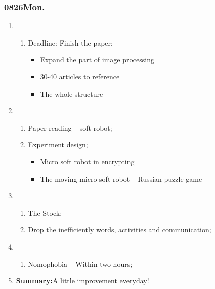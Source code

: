\subsubsection{0826Mon.}
\begin{enumerate}
	\item \ncquaone
	\begin{enumerate}[(1)]
		\item Deadline: Finish the paper;\rightundoneBlack
		\begin{itemize}
			\item Expand the part of image processing
			\item 30-40 articles to reference
			\item The whole structure 
		\end{itemize}
	\end{enumerate}
	
	\item \ncquatwo	
	\begin{enumerate}[(1)]
		\item Paper reading -- soft robot;\rightundoneBlack
		\item Experiment design;\rightundoneBlack
		\begin{itemize}
			\item Micro soft robot in encrypting
			\item The moving micro soft robot -- Russian puzzle game 
		\end{itemize}
		
	\end{enumerate}
	
	\item \ncquathree
	\begin{enumerate}[(1)]
		\item The Stock;\rightundoneBlack
		\item Drop the inefficiently words, activities and communication;\rightundoneBlack
	\end{enumerate}
	
	\item \ncquafour	
	\begin{enumerate}[(1)]
		\item Nomophobia -- Within two hours;\rightundoneBlack
	\end{enumerate}
	\item \textbf{Summary:}A little improvement everyday! 
\end{enumerate}
